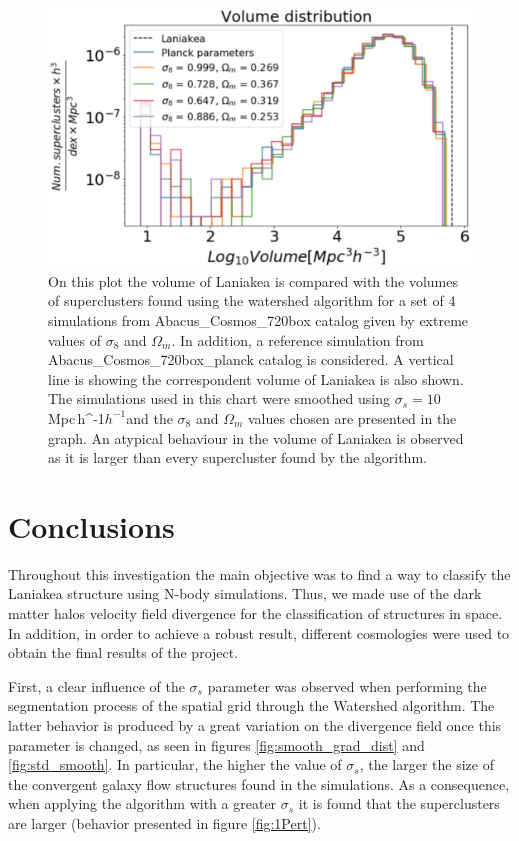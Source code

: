 \documentclass[usenatbib]{mnras}
\newcommand{\Mpch}{\,{\rm Mpc}\,\ifmmode h^{-1}\else $h^{-1}$\fi}
\begin{document}
\begin{figure}
    \centering
    \includegraphics[width=345pt]{vol_different_simulations.pdf}
    \caption{On this plot the volume of Laniakea is compared with the
      volumes of superclusters found using the watershed algorithm for
      a set of 4 simulations from Abacus\_Cosmos\_720box catalog given
      by extreme values of $\sigma_8$ and $\Omega_m$. In addition, a
      reference simulation from Abacus\_Cosmos\_720box\_planck catalog
      is considered. A vertical line is showing the correspondent
      volume of Laniakea is also shown. The simulations used in this
      chart were smoothed using $\sigma_s = 10$\,\Mpch and the
      $\sigma_8$ and $\Omega_m$ values chosen are presented in the
      graph. An atypical behaviour in the volume of Laniakea is
      observed as it is larger than every supercluster found by the
      algorithm.}  
    \label{fig:diferentes}
\end{figure}




\section{Conclusions}
\label{sec:conclusions}


Throughout this investigation the main objective was to find a way to classify the Laniakea structure using N-body simulations. Thus, we made use of the dark matter halos velocity field divergence for the classification of structures in space. In addition, in order to achieve a robust result, different cosmologies were used to obtain the final results of the project.


First, a clear influence of the $\sigma_s$ parameter was observed when performing the segmentation process of the spatial grid through the Watershed algorithm. The latter behavior is produced by a great variation on the divergence field once this parameter is changed, as seen in figures \ref{fig:smooth_grad_dist} and \ref{fig:std_smooth}. In particular, the higher the value of $\sigma_s$, the larger the size of the convergent galaxy flow structures found in the simulations. As a consequence, when applying the algorithm with a greater $\sigma_s$ it is found that the superclusters are larger (behavior presented in figure \ref{fig:1Pert}).
\end{document}
